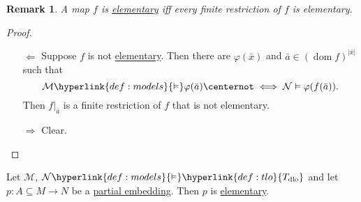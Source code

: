 \documentclass{article}
\let\models\vDash
\DeclareMathOperator{\dom}{dom}
\DeclareMathOperator{\img}{img}
\newtheorem{nremark}[nthm]{Remark}
\begin{document}
\begin{nremark}\label{rem:4.11}
  A map $f$ is \hyperlink{def:elmap}{elementary} iff every finite restriction of $f$ is elementary.
\end{nremark}
\begin{proof}\leavevmode
  \begin{itemize}
    \item[$\Leftarrow$] Suppose $f$ is not \hyperlink{def:elmap}{elementary}. Then there are $\varphi(\bar{x})$ and $\bar{a} \in (\dom f)^{|\bar{x}|}$ such that
      \begin{equation*}\mathcal{M} \hyperlink{def:models}{\models} \varphi(\bar{a}) \centernot\iff \mathcal{N} \models \varphi(f(\bar{a})).\end{equation*}
        Then $f|_{\bar{a}}$ is a finite restriction of $f$ that is not elementary.

  \item[$\Rightarrow$] Clear.\qedhere
  \end{itemize}
\end{proof}
\begin{nprop}\label{prop:4.12}
  Let $\mathcal{M}$, $\mathcal{N} \hyperlink{def:models}{\models} \hyperlink{def:tlo}{T_{\text{dlo}}}$ and let $p: A \subseteq M \to N$ be a \hyperlink{def:pe}{partial embedding}.
  Then $p$ is \hyperlink{def:elmap}{elementary}.
\end{nprop}
\end{document}
